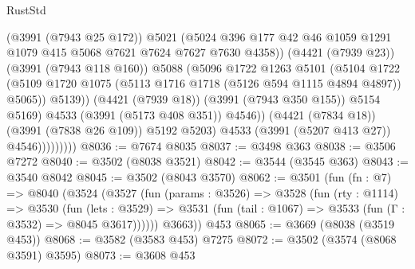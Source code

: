 \begin{lexlean}{RustStd}
\begin{coremodule}
                                  (@3991 (@7943 @25 @172))
                                  @5021
                                  (@5024
                                    @396
                                    @177
                                    @42
                                    @46
                                    @1059
                                    @1291
                                    @1079
                                    @415
                                    @5068
                                    @7621
                                    @7624
                                    @7627
                                    @7630
                                    @4358))
                                (@4421 (@7939 @23))
                                (@3991 (@7943 @118 @160))
                                @5088
                                (@5096
                                  @1722
                                  @1263
                                  @5101
                                  (@5104
                                    @1722
                                    (@5109
                                      @1720
                                      @1075
                                      (@5113 @1716 @1718 (@5126 @594 @1115 @4894 @4897))
                                      @5065))
                                  @5139))
                              (@4421 (@7939 @18))
                              (@3991 (@7943 @350 @155))
                              @5154
                              @5169)
                            @4533
                            (@3991 (@5173 @408 @351))
                            @4546))
                        (@4421 (@7834 @18))
                        (@3991 (@7838 @26 @109))
                        @5192
                        @5203)
                      @4533
                      (@3991 (@5207 @413 @27))
                      @4546)))))))))
@8036 := @7674 @8035
@8037 := @3498 @363
@8038 := @3506 @7272
@8040 := @3502 (@8038 @3521)
@8042 := @3544 (@3545 @363)
@8043 := @3540 @8042
@8045 := @3502 (@8043 @3570)
@8062 := @3501
    (fun (fn : @7) =>
    @8040
      (@3524
        (@3527
          (fun (params : @3526) =>
          @3528
            (fun (rty : @1114) =>
            @3530
              (fun (lets : @3529) =>
              @3531 (fun (tail : @1067) => @3533 (fun (Γ : @3532) => @8045 @3617))))))
        @3663))
    @453
@8065 := @3669 (@8038 (@3519 @453))
@8068 := @3582 (@3583 @453) @7275
@8072 := @3502 (@3574 (@8068 @3591) @3595)
@8073 := @3608 @453

\end{coremodule}
\end{lexlean}
